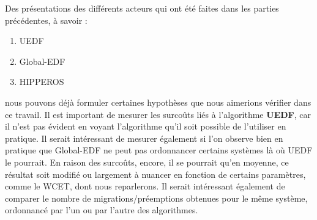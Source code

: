 	Des présentations des différents acteurs qui ont été faites dans les parties précédentes, à savoir :
	\begin{enumerate}
		\setlength\itemsep{0.1em}
		\item UEDF
		\item Global-EDF
		\item HIPPEROS
	\end{enumerate}
	nous pouvons déjà formuler certaines hypothèses que nous aimerions vérifier dans ce travail. \newline
	Il est important de mesurer les surcoûts liés à l'algorithme \textbf{UEDF}, car il n'est pas 
	évident en voyant l'algorithme qu'il soit possible de l'utiliser en pratique. \newline
	Il serait intéressant de mesurer également si l'on observe bien en pratique que Global-EDF ne 
	peut pas ordonnancer certains systèmes là où UEDF le pourrait. En raison des surcoûts, encore, il 
	se pourrait qu'en moyenne, ce résultat soit modifié ou largement à nuancer en 
	fonction de certains paramètres, comme le WCET, dont nous reparlerons.
	Il serait intéressant également de comparer le nombre de migrations/préemptions 
	obtenues pour le même système, ordonnancé par l'un ou par l'autre des algorithmes.

